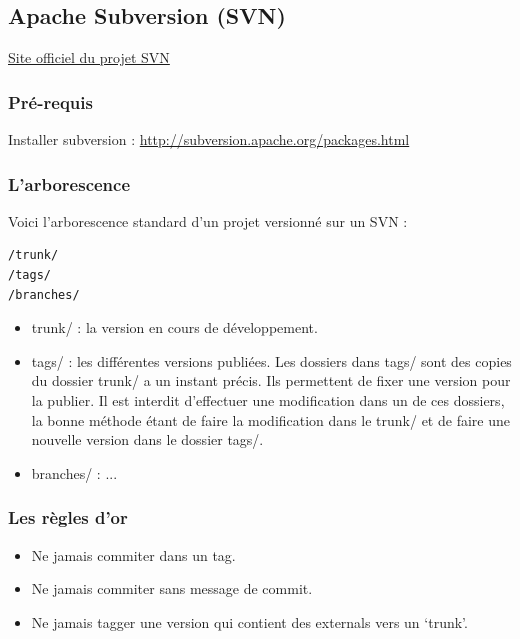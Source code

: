 \documentclass[letterpaper,10pt,french]{manual}
\begin{document}
\hypertarget{svn}{}\subsection{Apache Subversion (SVN)}

\href{http://subversion.apache.org/}{Site officiel du projet SVN}


\subsubsection{Pré-requis}

Installer subversion :
\href{http://subversion.apache.org/packages.html}{http://subversion.apache.org/packages.html}


\subsubsection{L'arborescence}

Voici l'arborescence standard d'un projet versionné sur un SVN :

\begin{Verbatim}[commandchars=@\[\]]
/trunk/
/tags/
/branches/
\end{Verbatim}
\begin{itemize}
\item {} 
trunk/ : la version en cours de développement.

\item {} 
tags/ : les différentes versions publiées. Les dossiers dans tags/ sont des
copies du dossier trunk/ a un instant précis. Ils permettent de fixer une
version pour la publier. Il est interdit d'effectuer une modification dans un
de ces dossiers, la bonne méthode étant de faire la modification dans le
trunk/ et de faire une nouvelle version dans le dossier tags/.

\item {} 
branches/ : ...

\end{itemize}


\subsubsection{Les règles d'or}
\begin{itemize}
\item {} 
Ne jamais commiter dans un tag.

\item {} 
Ne jamais commiter sans message de commit.

\item {} 
Ne jamais tagger une version qui contient des externals vers un `trunk'.

\end{itemize}
\end{document}
